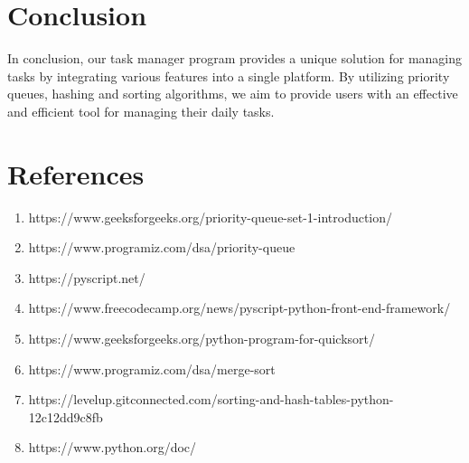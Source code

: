 \documentclass{article}
\begin{document}
\section{Conclusion}
In conclusion, our task manager program provides a unique solution for managing tasks by integrating various features into a single platform. By utilizing priority queues, hashing and sorting algorithms, we aim to provide users with an effective and efficient tool for managing their daily tasks.

\section{References}
\begin{enumerate}
    \item https://www.geeksforgeeks.org/priority-queue-set-1-introduction/
    \item https://www.programiz.com/dsa/priority-queue
    \item https://pyscript.net/
    \item https://www.freecodecamp.org/news/pyscript-python-front-end-framework/
    \item https://www.geeksforgeeks.org/python-program-for-quicksort/
    \item https://www.programiz.com/dsa/merge-sort
    \item https://levelup.gitconnected.com/sorting-and-hash-tables-python-12c12dd9c8fb
    \item https://www.python.org/doc/
\end{enumerate}
\end{document}

